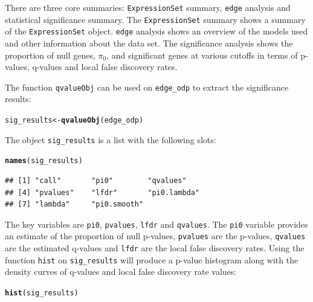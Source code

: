 \documentclass{article}\usepackage[]{graphicx}\usepackage[]{color}
\makeatletter
\newcommand{\hlstd}[1]{\textcolor[rgb]{0.345,0.345,0.345}{#1}}%
\newcommand{\hlkwb}[1]{\textcolor[rgb]{0.69,0.353,0.396}{#1}}%
\newcommand{\hlkwd}[1]{\textcolor[rgb]{0.737,0.353,0.396}{\textbf{#1}}}%
\newenvironment{kframe}{%
 \def\at@end@of@kframe{}%
 \ifinner\ifhmode%
  \def\at@end@of@kframe{\end{minipage}}%
  \begin{minipage}{\columnwidth}%
 \fi\fi%
 \def\FrameCommand##1{\hskip\@totalleftmargin \hskip-\fboxsep
 \colorbox{shadecolor}{##1}\hskip-\fboxsep
     \hskip-\linewidth \hskip-\@totalleftmargin \hskip\columnwidth}%
 \MakeFramed {\advance\hsize-\width
   \@totalleftmargin\z@ \linewidth\hsize
   \@setminipage}}%
 {\par\unskip\endMakeFramed%
 \at@end@of@kframe}
\newenvironment{knitrout}{}{} %
\makeatother
\begin{document}
There are three core summaries: {\tt ExpressionSet} summary, {\tt edge} analysis and statistical significance summary. The {\tt ExpressionSet} summary shows a summary of the {\tt ExpressionSet} object. {\tt edge} analysis shows an overview of the models used and other information about the data set. The significance analysis shows the proportion of null genes, $\pi_{0}$, and significant genes at various cutoffs in terms of p-values, q-values and local false discovery rates.

The function {\tt qvalueObj} can be used on {\tt edge\_odp} to extract the significance results:
\begin{knitrout}
\color{fgcolor}\begin{kframe}
\begin{alltt}
\hlstd{sig_results} \hlkwb{<-} \hlkwd{qvalueObj}\hlstd{(edge_odp)}
\end{alltt}
\end{kframe}
\end{knitrout}

The object {\tt sig\_results} is a list with the following slots:
\begin{knitrout}
\color{fgcolor}\begin{kframe}
\begin{alltt}
\hlkwd{names}\hlstd{(sig_results)}
\end{alltt}
\begin{verbatim}
## [1] "call"       "pi0"        "qvalues"   
## [4] "pvalues"    "lfdr"       "pi0.lambda"
## [7] "lambda"     "pi0.smooth"
\end{verbatim}
\end{kframe}
\end{knitrout}

The key variables are {\tt pi0}, {\tt pvalues}, {\tt lfdr} and {\tt qvalues}. The {\tt pi0} variable provides an estimate of the proportion of null p-values, {\tt pvalues} are the p-values, {\tt qvalues} are the estimated q-values and {\tt lfdr} are the local false discovery rates. Using the function {\tt hist} on {\tt sig\_results} will produce a p-value histogram along with the density curves of q-values and local false discovery rate values:
\begin{knitrout}
\color{fgcolor}\begin{kframe}
\begin{alltt}
\hlkwd{hist}\hlstd{(sig_results)}
\end{alltt}
\end{kframe}
\end{knitrout}
\end{document}
